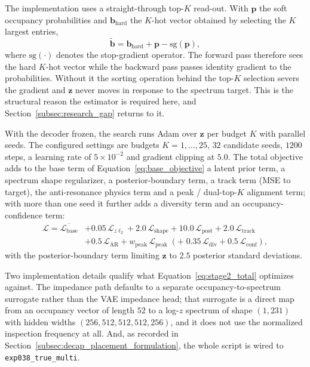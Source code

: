 The implementation uses a straight-through top-$K$ read-out. With $\mathbf{p}$
the soft occupancy probabilities and $\mathbf{b}_{\mathrm{hard}}$ the $K$-hot
vector obtained by selecting the $K$ largest entries,
\begin{equation}
\tilde{\mathbf{b}} = \mathbf{b}_{\mathrm{hard}} + \mathbf{p} - \mathrm{sg}(\mathbf{p}),
\label{eq:ste}
\end{equation}
where $\mathrm{sg}(\cdot)$ denotes the stop-gradient operator. The forward pass
therefore sees the hard $K$-hot vector while the backward pass passes identity
gradient to the probabilities. Without it the sorting operation behind the
top-$K$ selection severs the gradient and $\mathbf{z}$ never moves in response to
the spectrum target. This is the structural reason the estimator is required
here, and Section~\ref{subsec:research_gap} returns to it.

With the decoder frozen, the search runs Adam over $\mathbf{z}$ per budget $K$
with parallel seeds. The configured settings are budgets $K = 1,\dots,25$, $32$
candidate seeds, $1200$ steps, a learning rate of $5\times10^{-2}$ and gradient
clipping at $5.0$. The total objective adds to the base term of
Equation~\ref{eq:base_objective} a latent prior term, a spectrum shape
regularizer, a posterior-boundary term, a track term (MSE to target), the
anti-resonance physics term and a peak / dual-top-$K$ alignment term; with more
than one seed it further adds a diversity term and an occupancy-confidence term:
\begin{equation}
\begin{split}
\mathcal{L} = \overline{\mathcal{L}_{\mathrm{base}}}
&+ 0.05\,\mathcal{L}_{z\ell_2}
+ 2.0\,\mathcal{L}_{\mathrm{shape}}
+ 10.0\,\mathcal{L}_{\mathrm{post}}
+ 2.0\,\mathcal{L}_{\mathrm{track}} \\
&+ 0.5\,\mathcal{L}_{\mathrm{AR}}
+ w_{\mathrm{peak}}\,\mathcal{L}_{\mathrm{peak}}
\;(+\; 0.35\,\mathcal{L}_{\mathrm{div}}
+ 0.5\,\mathcal{L}_{\mathrm{conf}}),
\end{split}
\label{eq:stage2_total}
\end{equation}
with the posterior-boundary term limiting $\mathbf{z}$ to $2.5$ posterior
standard deviations.

Two implementation details qualify what Equation~\ref{eq:stage2_total} optimizes
against. The impedance path defaults to a separate occupancy-to-spectrum
surrogate rather than the VAE impedance head; that surrogate is a direct map from
an occupancy vector of length $52$ to a log-$z$ spectrum of shape $(1,231)$ with
hidden widths $(256, 512, 512, 512, 256)$, and it does not use the normalized
inspection frequency at all. And, as recorded in
Section~\ref{subsec:decap_placement_formulation}, the whole script is wired to
\texttt{exp038\_true\_multi}.


